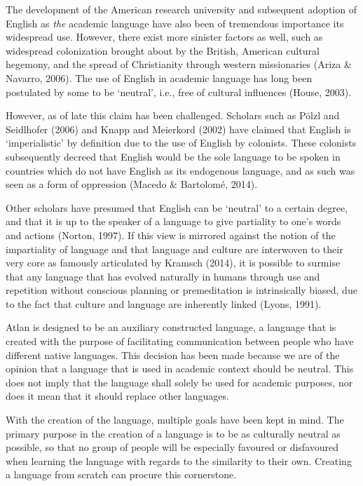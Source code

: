 The development of the American research university and subsequent adoption of English as \textit{the} academic language have also been of tremendous importance its widespread use. However, there exist more sinister factors as well, such as widespread colonization brought about by the British, American cultural hegemony, and the spread of Christianity through western missionaries (Ariza \& Navarro, 2006). The use of English in academic language has long been postulated by some to be ‘neutral’, i.e., free of cultural influences (House, 2003). 

However, as of late this claim has been challenged. Scholars such as Pölzl and Seidlhofer (2006) and Knapp and Meierkord (2002) have claimed that English is ‘imperialistic’ by definition due to the use of English by colonists. These colonists subsequently decreed that English would be the sole language to be spoken in countries which do not have English as its endogenous language, and as such was seen as a form of oppression (Macedo \& Bartolomé, 2014).

Other scholars have presumed that English can be ‘neutral’ to a certain degree, and that it is up to the speaker of a language to give partiality to one’s words and actions (Norton, 1997). If this view is mirrored against the notion of the impartiality of language and that language and culture are interwoven to their very core as famously articulated by Kramsch (2014), it is possible to surmise that any language that has evolved naturally in humans through use and repetition without conscious planning or premeditation is intrinsically biased, due to the fact that culture and language are inherently linked (Lyons, 1991). 

Atlan is designed to be an auxiliary constructed language, a language that is created with the purpose of facilitating communication between people who have different native languages. This decision has been made because we are of the opinion that a language that is used in academic context should be neutral. This does not imply that the language shall solely be used for academic purposes, nor does it mean that it should replace other languages. 

With the creation of the language, multiple goals have been kept in mind. The primary purpose in the creation of a language is to be as culturally neutral as possible, so that no group of people will be especially favoured or disfavoured when learning the language with regards to the similarity to their own. Creating a language from scratch can procure this cornerstone. 

